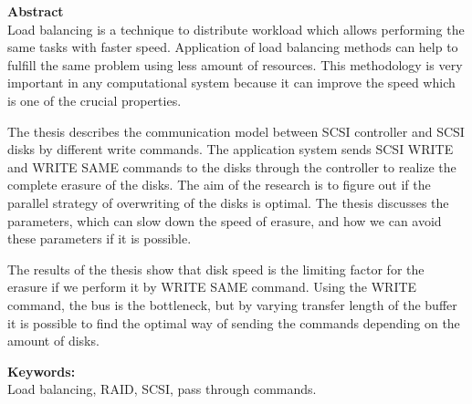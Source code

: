 {\bf Abstract}\\


Load balancing is a technique to distribute workload which allows performing the same tasks with faster speed. Application of load balancing methods can help to fulfill the same problem using less amount of resources. This methodology is very important in any computational system because it can improve the speed which is one of the crucial properties. 

The thesis describes the communication model between SCSI controller and SCSI disks by different write commands. The application system sends SCSI WRITE and WRITE SAME commands to the disks through the controller to realize the complete erasure of the disks. The aim of the research is to figure out if the parallel strategy of overwriting of the disks is optimal. The thesis discusses the parameters, which can slow down the speed of erasure, and how we can avoid these parameters if it is possible.

The results of the thesis show that disk speed is the limiting factor for the erasure if we perform it by WRITE SAME command. Using the WRITE command, the bus is the bottleneck, but by varying transfer length of the buffer it is possible to find the optimal way of sending the commands depending on the amount of disks.





{\bf Keywords:}\\
Load balancing, RAID, SCSI, pass through commands.
